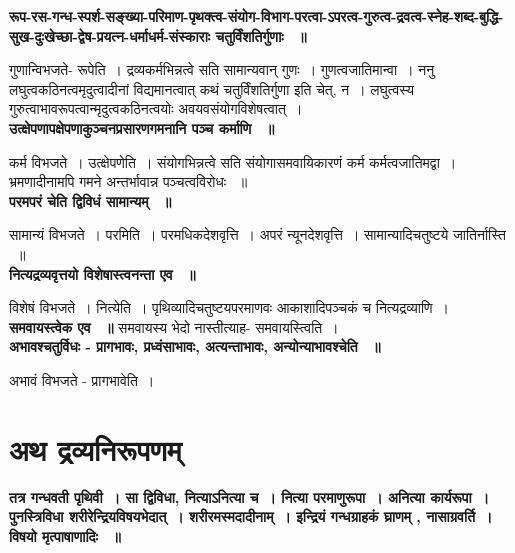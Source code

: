	{\bfseries रूप-रस-गन्ध-स्पर्श-सङ्ख्या-परिमाण-पृथक्‍त्व-संयोग-विभाग-परत्वा-ऽपरत्व-गुरुत्व-द्रवत्व-स्‍नेह-शब्द-बुद्धि-सुख-दुःखेच्छा-द्वेष-प्रयत्‍न-धर्माधर्म-संस्काराः चतुर्विंशतिर्गुणाः ~॥}\par
		गुणान्विभजते- रूपेति~। द्रव्यकर्मभिन्नत्वे सति सामान्यवान् गुणः~। गुणत्वजातिमान्वा~। ननु लघुत्वकठिनत्वमृदुत्वादीनां विद्यमानत्वात् कथं चतुर्विंशतिर्गुणा इति चेत्, न~। लघुत्वस्य गुरुत्वाभावरूपत्वान्मृदुत्वकठिनत्वयोः अवयवसंयोगविशेषत्वात्~।\\[10pt]
	{\bfseries उत्क्षेपणापक्षेपणाकुञ्चनप्रसारणगमनानि पञ्च कर्माणि ~॥}\par
		कर्म विभजते~। उत्क्षेपणेति~। संयोगभिन्नत्वे सति संयोगासमवायिकारणं कर्म कर्मत्वजातिमद्वा~। भ्रमणादीनामपि गमने अन्तर्भावान्न पञ्चत्वविरोधः ~॥\\[10pt]
	{\bfseries परमपरं चेति द्विविधं सामान्यम् ~॥}\par
		सामान्यं विभजते~। परमिति~। परमधिकदेशवृत्ति~। अपरं न्यूनदेशवृत्ति~। सामान्यादिचतुष्टये जातिर्नास्ति ~॥\\[10pt]
	{\bfseries नित्यद्रव्यवृत्तयो विशेषास्त्वनन्ता एव ~॥}\par
		विशेषं विभजते~। नित्येति~। पृथिव्यादिचतुष्टयपरमाणवः आकाशादिपञ्चकं च नित्यद्रव्याणि~।\\[10pt]
	{\bfseries समवायस्त्वेक एव ~॥}
		समवायस्य भेदो नास्तीत्याह- समवायस्त्विति~।\\[10pt]
	{\bfseries अभावश्चतुर्विधः - प्रागभावः, प्रध्वंसाभावः, अत्यन्ताभावः, अन्योन्याभावश्चेति ~॥}\par
		अभावं विभजते - प्रागभावेति~। \section*{अथ द्रव्यनिरूपणम्}
	{\bfseries तत्र गन्धवती पृथिवी~। सा द्विविधा, नित्याऽनित्या च~। नित्या परमाणुरूपा~। अनित्या कार्यरूपा~। पुनस्त्रिविधा शरीरेन्द्रियविषयभेदात्~। शरीरमस्मदादीनाम्~। इन्द्रियं गन्धग्राहकं घ्राणम् , नासाग्रवर्ति~। विषयो मृत्पाषाणादिः ~॥}\par
